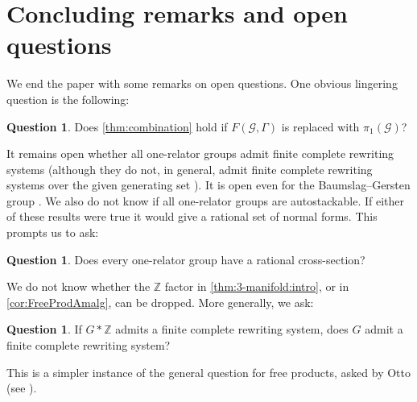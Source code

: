 \documentclass[12pt, a4paper]{amsart}
\theoremstyle{definition}
\newtheorem{question}[theorem]{Question}
\newcommand{\Z}{\mathbb{Z}}
\begin{document}
\section{Concluding remarks and open questions} 

We end the paper with some remarks on open questions. One obvious lingering question is the following:

\begin{question}
Does \cref{thm:combination} hold if $F(\mathcal{G}, \Gamma)$ is replaced with $\pi_1(\mathcal{G})$?
\end{question}


It remains open whether all one-relator groups admit finite complete rewriting systems (although they do not, in general, admit finite complete rewriting systems over the given generating set \cite{jantzen1985note}). It is open even for the Baumslag--Gersten group \cite{hermiller2018hnn}. We also do not know if all one-relator groups are autostackable. If either of these results were true it would give a rational set of normal forms. This prompts us to ask:   

\begin{question}
Does every one-relator group have a rational cross-section?     
\end{question}


We do not know whether the $\Z$ factor in \cref{thm:3-manifold:intro}, or in \cref{cor:FreeProdAmalg}, can be dropped. More generally, we ask:

\begin{question}
If $G*\Z$ admits a finite complete rewriting system, does $G$ admit a finite complete rewriting system?
\end{question}

This is a simpler instance of the general question for free products, asked by Otto (see \cite{Pride_Wang_2000}).
\end{document}
